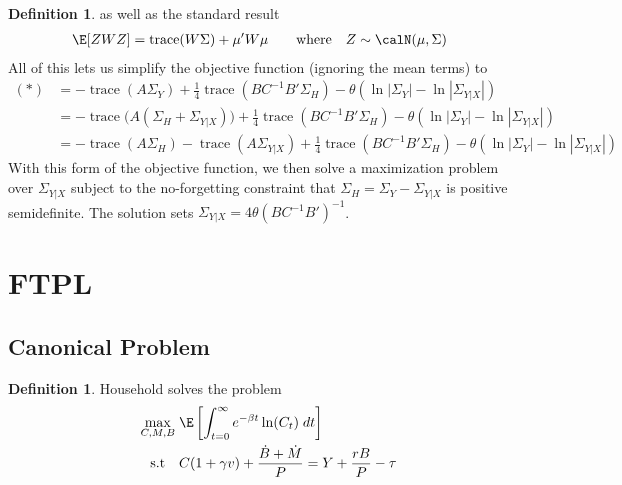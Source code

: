 \documentclass[12pt]{article}
\theoremstyle{plain}
\theoremstyle{definition}
\newtheorem{defn}[thm]{Definition}
\theoremstyle{remark}
\newcommand{\trace}{\operatorname{trace}}
\begin{document}
\begin{defn}
as well as the standard result
\begin{align*}
  \E[ZWZ]
  = \trace(W\Sigma) + \mu'W\mu
  \qquad \text{where}\quad
  Z\sim\calN(\mu,\Sigma)
\end{align*}
All of this lets us simplify the objective function (ignoring the mean
terms) to
\begin{align*}
  (*)
  &=
  -\trace(A\Sigma_Y)
  +\frac{1}{4}\trace(BC^{-1}B'\Sigma_H)
  -\theta(\ln |\Sigma_Y|-\ln|\Sigma_{Y|X}|)
  \\
  &=
  -\trace\big(A(\Sigma_H+\Sigma_{Y|X})\big)
  +\frac{1}{4}\trace(BC^{-1}B'\Sigma_H)
  -\theta(\ln |\Sigma_Y|-\ln|\Sigma_{Y|X}|)
  \\
  &=
  -\trace(A\Sigma_H)
  -\trace(A\Sigma_{Y|X})
  +\frac{1}{4}\trace(BC^{-1}B'\Sigma_H)
  -\theta(\ln |\Sigma_Y|-\ln|\Sigma_{Y|X}|)
\end{align*}
With this form of the objective function, we then solve a maximization
problem over $\Sigma_{Y|X}$ subject to the no-forgetting constraint that
$\Sigma_H=\Sigma_Y-\Sigma_{Y|X}$ is positive semidefinite.
The solution sets $\Sigma_{Y|X}=4\theta (BC^{-1}B')^{-1}$.

\end{defn}

\clearpage
\section{FTPL}

\subsection{Canonical Problem}


\begin{defn}
Household solves the problem
\begin{align*}
  \max_{C,M,B}
  \; &
  \E\left[
    \int_{t=0}^\infty
    e^{-\beta t}\ln(C_t)\;dt
  \right]
  \\
  \qquad \text{s.t}\quad
  &
  C (1+\gamma v) + \frac{\dot{B}+\dot{M}}{P}
  = Y + \frac{rB}{P} - \tau
\end{align*}
\end{defn}
\end{document}
